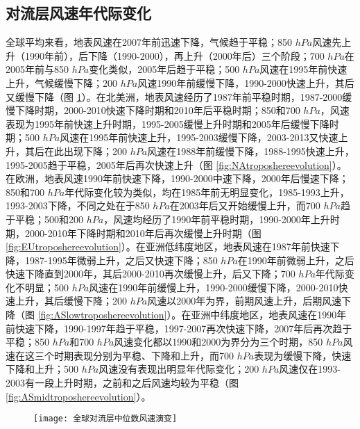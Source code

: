 \subsection{对流层风速年代际变化}

全球平均来看，地表风速在2007年前迅速下降，气候趋于平稳；850 $hPa$风速先上升（1990年前），后下降（1990-2000），再上升（2000年后）三个阶段；700 $hPa$在2005年前与850 $hPa$变化类似，2005年后趋于平稳；500 $hPa$风速在1995年前快速上升，气候缓慢下降；200 $hPa$风速1990年前缓慢下降，1990-2000快速上升，其后又缓慢下降（图 \ref{fig:globaltroposhereevolution}）。在北美洲，地表风速经历了1987年前平稳时期，1987-2000缓慢下降时期，2000-2010快速下降时期和2010年后平稳时期；850和700 $hPa$，风速表现为1995年前快速上升时期，1995-2005缓慢上升时期和2005年后缓慢下降时期；500 $hPa$风速在1995年前快速上升，1995-2003缓慢下降，2003-2013又快速上升，其后在此出现下降；200 $hPa$风速在1988年前缓慢下降，1988-1995快速上升，1995-2005趋于平稳，2005年后再次快速上升（图 \ref{fig:NAtroposhereevolution}）。在欧洲，地表风速1990年前快速下降，1990-2000中速下降，2000年后慢速下降；850和700 $hPa$年代际变化较为类似，均在1985年前无明显变化，1985-1993上升，1993-2003下降，不同之处在于850 $hPa$在2003年后又开始缓慢上升，而700 $hPa$趋于平稳；500和200 $hPa$，风速均经历了1990年前平稳时期，1990-2000年上升时期，2000-2010年下降时期和2010年后再次缓慢上升时期（图 \ref{fig:EUtroposhereevolution}）。在亚洲低纬度地区，地表风速在1987年前快速下降，1987-1995年微弱上升，之后又快速下降；850 $hPa$在1990年前微弱上升，之后快速下降直到2000年，其后2000-2010再次缓慢上升，后又下降；700 $hPa$年代际变化不明显；500 $hPa$风速在1990年前缓慢上升，1990-2000缓慢下降，2000-2010快速上升，其后缓慢下降；200 $hPa$风速以2000年为界，前期风速上升，后期风速下降（图 \ref{fig:ASlowtroposhereevolution}）。在亚洲中纬度地区，地表风速在1990年前快速下降，1990-1997年趋于平稳，1997-2007再次快速下降，2007年后再次趋于平稳；850 $hPa$和700 $hPa$风速变化都以1990和2000为界分为三个时期，850 $hPa$风速在这三个时期表现分别为平稳、下降和上升，而700 $hPa$表现为缓慢下降，快速下降和上升；500 $hPa$风速没有表现出明显年代际变化；200 $hPa$风速仅在1993-2003有一段上升时期，之前和之后风速均较为平稳（图 \ref{fig:ASmidtroposhereevolution}）。

\begin{figure}[!htbp]
    \centering
    \texttt{[image: 全球对流层中位数风速演变]}
    \label{fig:globaltroposhereevolution}
\end{figure}

